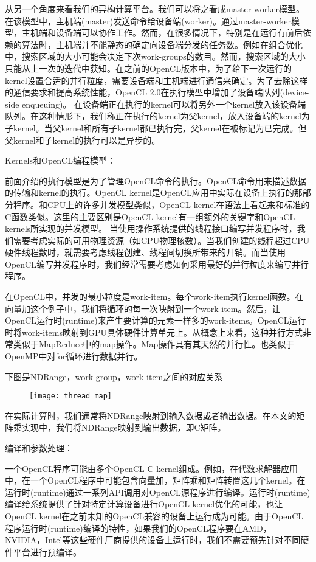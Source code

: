 从另一个角度来看我们的异构计算平台。我们可以将之看成master-worker模型。在该模型中，主机端(master)发送命令给设备端(worker)。通过master-worker模型，主机端和设备端可以协作工作。然而，在很多情况下，特别是在运行有前后依赖的算法时，主机端并不能静态的确定向设备端分发的任务数。例如在组合优化中，搜索区域的大小可能会决定下次work-groups的数目。然而，搜索区域的大小只能从上一次的迭代中获知。在之前的OpenCL版本中，为了给下一次运行的kernel设置合适的并行粒度，需要设备端和主机端进行通信来确定。为了去除这样的通信要求和提高系统性能，OpenCL 2.0在执行模型中增加了设备端队列(device-side enqueuing)。
在设备端正在执行的kernel可以将另外一个kernel放入该设备端队列。在这种情形下，我们称正在执行的kernel为父kernel，放入设备端的kernel为子kernel。当父kernel和所有子kernel都已执行完，父kernel在被标记为已完成。但父kernel和子kernel的执行可以是异步的。

Kernels和OpenCL编程模型：

前面介绍的执行模型是为了管理OpenCL命令的执行。OpenCL命令用来描述数据的传输和kernel的执行。OpenCL kernel是OpenCL应用中实际在设备上执行的那部分程序。和CPU上的许多并发模型类似，OpenCL kernel在语法上看起来和标准的C函数类似。这里的主要区别是OpenCL kernel有一组额外的关键字和OpenCL kernels所实现的并发模型。   
当使用操作系统提供的线程接口编写并发程序时，我们需要考虑实际的可用物理资源（如CPU物理核数）。当我们创建的线程超过CPU硬件线程数时，就需要考虑线程创建、线程间切换所带来的开销。而当使用OpenCL编写并发程序时，我们经常需要考虑如何采用最好的并行粒度来编写并行程序。

在OpenCL中，并发的最小粒度是work-item。每个work-item执行kernel函数。在向量加这个例子中，我们将循环的每一次映射到一个work-item。然后，让OpenCL运行时(runtime)来产生要计算的元素一样多的work-items。OpenCL运行时将work-items映射到GPU具体硬件计算单元上。从概念上来看，这种并行方式非常类似于MapReduce中的map操作。Map操作具有其天然的并行性。也类似于OpenMP中对for循环进行数据并行。

下图是NDRange，work-group，work-item之间的对应关系
\begin{figure}[htbp]
	\centering
	\texttt{[image: thread\_map]}
	\label{fig:thread_map}
\end{figure}

在实际计算时，我们通常将NDRange映射到输入数据或者输出数据。在本文的矩阵乘实现中，我们将NDRange映射到输出数据，即C矩阵。

编译和参数处理：

一个OpenCL程序可能由多个OpenCL C kernel组成。例如，在代数求解器应用中，在一个OpenCL程序中可能包含向量加，矩阵乘和矩阵转置这几个kernel。在运行时(runtime)通过一系列API调用对OpenCL源程序进行编译。运行时(runtime)编译给系统提供了针对特定计算设备进行OpenCL kernel优化的可能，也让OpenCL kernel在之前未知的OpenCL兼容的设备上运行成为可能。由于OpenCL程序运行时(runtime)编译的特性，如果我们的OpenCL程序要在AMD，NVIDIA，Intel等这些硬件厂商提供的设备上运行时，我们不需要预先针对不同硬件平台进行预编译。


